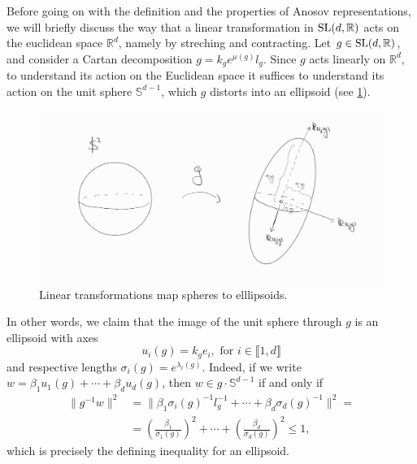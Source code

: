 \documentclass{report}
\begin{document}
Before going on with the definition and the properties of Anosov representations, we will briefly discuss the way that a linear transformation in $\operatorname{{\mathrm{SL}}}(d, \mathbb R)$ acts on the euclidean space $\mathbb R^d$, namely by streching and contracting.
Let $g \in \operatorname{{\mathrm{SL}}}(d, \mathbb R)$, and consider a Cartan decomposition $g = k_g e^{\mu(g)} l_g$.
Since $g$ acts linearly on $\mathbb R^d$, to understand its action on the Euclidean space it suffices to understand its action on the unit sphere $\mathbb S^{d-1}$, which $g$ distorts into an ellipsoid (see \cref{fig:ball_stretching}).
\begin{figure}[h]
    \centering
    \includegraphics[width=\textwidth]{ball_streching.jpg}
    \caption{Linear transformations map spheres to elllipsoids.}
    \label{fig:ball_stretching}
\end{figure}

In other words, we claim that the image of the unit sphere through $g$ is an ellipsoid with axes
\[
u_i(g) = k_g e_i, \text{ for } i \in \llbracket 1, d \rrbracket
\]
and respective lengths $\sigma_i(g) = e^{\lambda_i(g)}$.
Indeed, if we write $w = \beta_1 u_1(g) + \cdots + \beta_d u_d(g)$, then $w \in g \cdot \mathbb S^{d-1}$ if and only if 
\begin{align*}
    \| g^{-1}w \|^2 &= \| \beta_1 \sigma_i(g)^{-1} l_g^{-1} + \cdots + \beta_d \sigma_d(g)^{-1}\|^2 =\\
    &= \left(\frac{\beta_1}{\sigma_1(g)}\right)^2 + \cdots + \left(\frac{\beta_d}{\sigma_d(g)} \right)^2 \leq 1,
\end{align*}
which is precisely the defining inequality for an ellipsoid.
\end{document}

